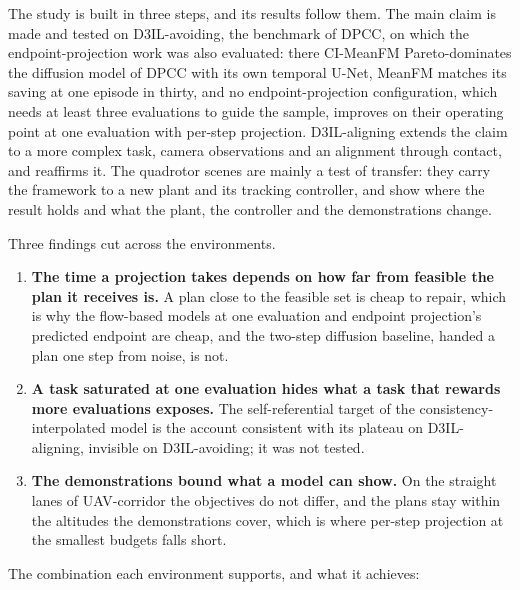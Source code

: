 The study is built in three steps, and its results follow them. The main claim is made and tested on
D3IL-avoiding, the benchmark of \ac{DPCC}, on which the endpoint-projection work was also evaluated: there
CI-MeanFM Pareto-dominates the diffusion model of \ac{DPCC} with its own temporal U-Net, MeanFM matches its
saving at one episode in thirty, and no
endpoint-projection configuration, which needs at least three evaluations to guide the sample, improves on their
operating point at one evaluation with per-step projection. D3IL-aligning extends the claim to a more complex
task, camera observations and an alignment through contact, and reaffirms it. The quadrotor scenes are mainly a
test of transfer: they carry the framework to a new plant and its tracking controller, and show where the result
holds and what the plant, the controller and the demonstrations change.

Three findings cut across the environments.

\begin{enumerate}
  \item \textbf{The time a projection takes depends on how far from feasible the plan it receives is.} A plan close to the
    feasible set is cheap to repair, which is why the flow-based models at one evaluation and endpoint
    projection's predicted endpoint are cheap, and the two-step diffusion baseline, handed a plan one step
    from noise, is not.
  \item \textbf{A task saturated at one evaluation hides what a task that rewards more evaluations exposes.}
    The self-referential target of the consistency-interpolated model is the account consistent with its
    plateau on D3IL-aligning, invisible on D3IL-avoiding; it was not tested.
  \item \textbf{The demonstrations bound what a model can show.} On the straight lanes of UAV-corridor the
    objectives do not differ, and the plans stay within the altitudes the demonstrations cover, which is
    where per-step projection at the smallest budgets falls short.
\end{enumerate}

The combination each environment supports, and what it achieves:

